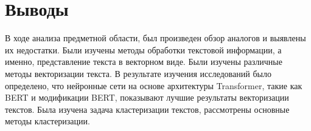 \section{Выводы}
В ходе анализа предметной области, был произведен обзор аналогов и выявлены их недостатки. Были изучены методы обработки текстовой информации, а именно, представление текста в векторном виде. Были изучены различные методы векторизации текста. В результате изучения исследований было определено, что нейронные сети на основе архитектуры Transformer, такие как BERT и модификации BERT, показывают лучшие результаты векторизации текстов. Была изучена задача кластеризации текстов, рассмотрены основные методы кластеризации.
